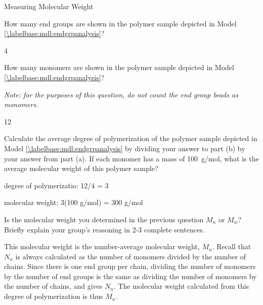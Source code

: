 \begin{activity}{Measuring Molecular Weight}
\begin{model}
\end{model}


\begin{ctqs}

	\question How many end groups are shown in the polymer sample depicted in Model \ref{\labelbase:mdl:endgrpanalysis}?
	
		\begin{solution}[0.25in]
			4
		\end{solution}
	
	\question How many monomers are shown in the polymer sample depicted in Model \ref{\labelbase:mdl:endgrpanalysis}?
	
		\emph{Note: for the purposes of this question, do not count the end group beads as monomers.}
	
		\begin{solution}[0.25in]
			12
		\end{solution}
	
	\question Calculate the average degree of polymerization of the polymer sample depicted in Model \ref{\labelbase:mdl:endgrpanalysis} by dividing your answer to part (b) by your answer from part (a).  If each monomer has a mass of 100~g/mol, what is the average molecular weight of this polymer sample?
	
		\begin{solution}[0.5in]
			degree of polymerizatio: 12/4 = 3
			
			molecular weight: 3(100 g/mol) = 300 g/mol
		\end{solution}
	
	\question Is the molecular weight you determined in the previous question $M_n$ or $M_w$?  Briefly explain your group's reasoning in 2-3 complete sentences.
	
		\begin{solution}[1.5in]
			This molecular weight is the number-average molecular weight, $M_n$.  Recall that $N_n$ is always calculated as the number of monomers divided by the number of chains.  Since there is one end group per chain, dividing the number of monomers by the number of end groups is the same as dividing the number of monomers by the number of chains, and gives $N_n$.  The molecular weight calculated from this degree of polymerization is thus $M_n$.
		\end{solution}
	
\end{ctqs}

\begin{infobox}


\end{infobox}
\end{activity}
